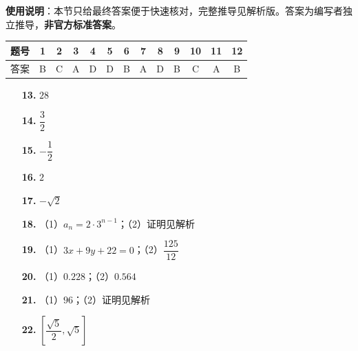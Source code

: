 
\begin{gknotice}
\textbf{使用说明}：本节只给最终答案便于快速核对，完整推导见解析版。答案为编写者独立推导，\textbf{非官方标准答案}。
\end{gknotice}

\begin{center}\begin{tabular}{ccccccccccccc}
\toprule
题号 & 1 & 2 & 3 & 4 & 5 & 6 & 7 & 8 & 9 & 10 & 11 & 12 \\
\midrule
答案 & B & C & A & D & D & B & A & D & B & C & A & B \\
\bottomrule
\end{tabular}\end{center}

\begin{itemize}[leftmargin=2.6em]
  \item[\textbf{13.}] $28$
  \item[\textbf{14.}] $\dfrac{3}{2}$
  \item[\textbf{15.}] $-\dfrac{1}{2}$
  \item[\textbf{16.}] $2$
\end{itemize}

\begin{itemize}[leftmargin=2.6em]
  \item[\textbf{17.}] $-\sqrt{2}$
  \item[\textbf{18.}] （1）$a_n=2\cdot 3^{n-1}$；（2）证明见解析
  \item[\textbf{19.}] （1）$3x+9y+22=0$；（2）$\dfrac{125}{12}$
  \item[\textbf{20.}] （1）$0.228$；（2）$0.564$
  \item[\textbf{21.}] （1）$96$；（2）证明见解析
  \item[\textbf{22.}] $\left[\dfrac{\sqrt{5}}{2}, \sqrt{5}\right]$
\end{itemize}
